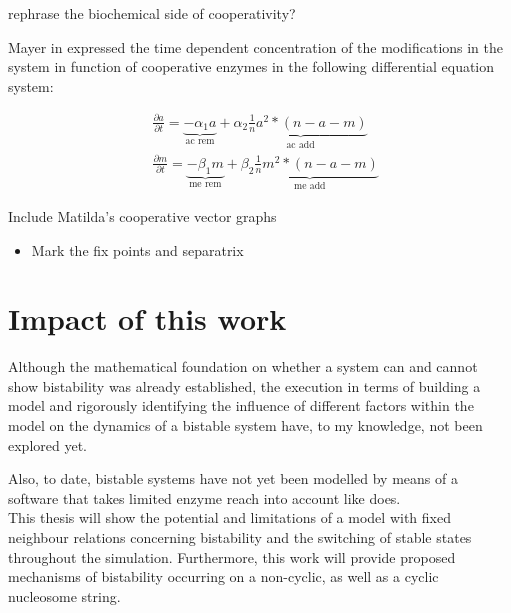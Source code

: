             \begin{itemize}
                {
                    \color{red}
                    \item rephrase the biochemical side of cooperativity?
                }
            \end{itemize}

            Mayer in \cite{mayer2020langevin} expressed the time dependent concentration of the modifications in the system in function of cooperative enzymes in the following differential equation system:

            \begin{subequations}
                \begin{align}
                    &\frac{\partial a}{\partial t} = \underbrace{- \alpha_1 a }_{\textrm{ac rem}} + \underbrace{ \alpha_2 \frac{1}{n} a^2*(n-a-m) }_{\textrm{ac add}}\\
                    &\frac{\partial m}{\partial t} = \underbrace{- \beta_1 m }_{\textrm{me rem}} + \underbrace{ \beta_2 \frac{1}{n} m^2*(n-a-m) }_{\textrm{me add}}
                \end{align}
                \label{eqn:cooperative}
            \end{subequations}
        \begin{itemize}
            {
                \color{red}
                \item Include Matilda's cooperative vector graphs
                    \begin{itemize}
                        \item Mark the fix points and separatrix
                    \end{itemize}
            }
        \end{itemize}
    \section{Impact of this work}
        Although the mathematical foundation on whether a system can and cannot show bistability was already established, the execution in terms of building a model and rigorously identifying the influence of different factors within the model on the dynamics of a bistable system have, to my knowledge, not been explored yet.

        Also, to date, bistable systems have not yet been modelled by means of a software that takes limited enzyme reach into account like \ed does.\\ %

        This thesis will show the potential and limitations of a model with fixed neighbour relations concerning bistability and the switching of stable states throughout the simulation. Furthermore, this work will provide proposed mechanisms of bistability occurring on a non-cyclic, as well as a cyclic nucleosome string.
%
%
